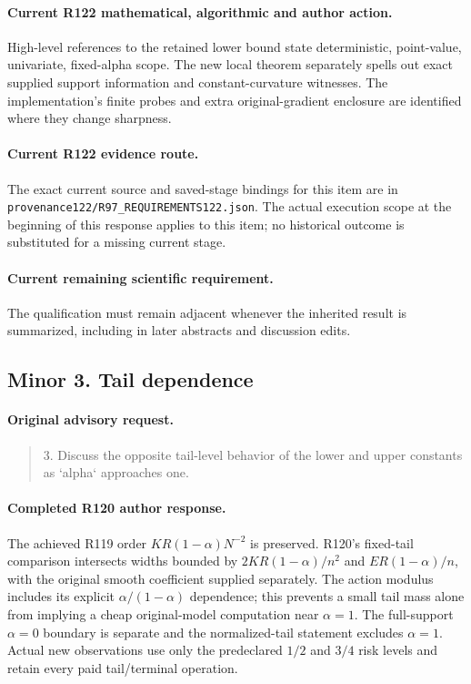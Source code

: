 \paragraph{Current R122 mathematical, algorithmic and author action.}
High-level references to the retained lower bound state deterministic, point-value, univariate, fixed-alpha scope. The new local theorem separately spells out exact supplied support information and constant-curvature witnesses. The implementation's finite probes and extra original-gradient enclosure are identified where they change sharpness.
\paragraph{Current R122 evidence route.}
The exact current source and saved-stage bindings for this item are in \nolinkurl{provenance122/R97_REQUIREMENTS122.json}. The actual execution scope at the beginning of this response applies to this item; no historical outcome is substituted for a missing current stage.
\paragraph{Current remaining scientific requirement.}
The qualification must remain adjacent whenever the inherited result is summarized, including in later abstracts and discussion edits.

\subsection{Minor 3. Tail dependence}
\label{response122:minor-3}

\paragraph{Original advisory request.}
\begin{quote}
3. Discuss the opposite tail-level behavior of the lower and upper constants as `alpha` approaches one.
\end{quote}

\paragraph{Completed R120 author response.}
The achieved R119 order $KR(1-\alpha)N^{-2}$ is preserved. R120's fixed-tail comparison intersects widths bounded by $2KR(1-\alpha)/n^2$ and $ER(1-\alpha)/n$, with the original smooth coefficient supplied separately. The action modulus includes its explicit $\alpha/(1-\alpha)$ dependence; this prevents a small tail mass alone from implying a cheap original-model computation near $\alpha=1$. The full-support $\alpha=0$ boundary is separate and the normalized-tail statement excludes $\alpha=1$. Actual new observations use only the predeclared $1/2$ and $3/4$ risk levels and retain every paid tail/terminal operation.

